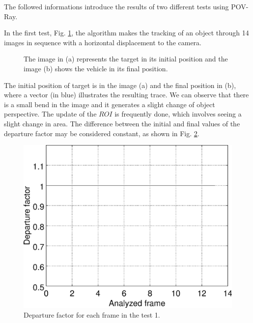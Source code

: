 The followed informations introduce the results of two different tests 
using POV-Ray.

In the first test, Fig. \ref{fig:imgpapercerta}, 
the algorithm makes the tracking of an object through 14 images in sequence with 
a horizontal displacement to the camera.

\begin{figure}[H]
\centering
  \caption{The image in (a) represents the target in its initial position 
   and the image (b) shows the vehicle in its final position.}
  \label{fig:imgpapercerta}
\end{figure}

The initial position of target is in the image (a) and the final position in (b), 
where a vector (in blue) illustrates the resulting trace.
We can observe that there is a small bend in the image 
and it generates a slight change of object perspective. 
The update of the $ROI$ is frequently done, which involves seeing a slight change in area.
The difference between the initial and final values of the departure factor may 
be considered constant, as shown in Fig. \ref{fig:res_graph1}.

\begin{figure}[H]
\centering
\includegraphics[width=0.8\columnwidth]{images/results2D_graph.eps}
\caption{Departure factor for each frame in the test 1.}
\label{fig:res_graph1}
\end{figure}

